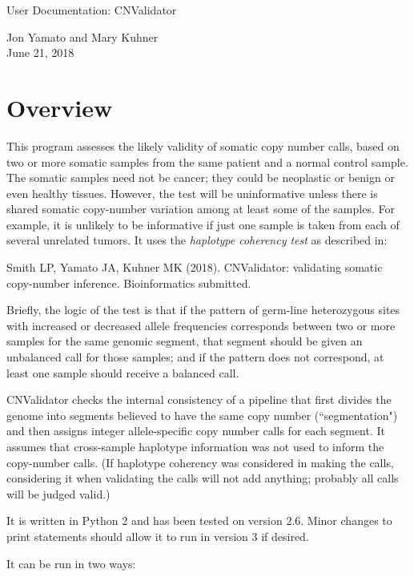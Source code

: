 \documentclass{article}
\begin{document}
 

\begin{large}
User Documentation:  CNValidator \\
\end{large}

{\flushleft
Jon Yamato and Mary Kuhner \\
June 21, 2018 \\
}

\section*{Overview}

This program assesses the likely validity of somatic copy number calls,
based on two or more somatic samples from the same patient and
a normal control sample.  The somatic
samples need not be cancer; they could be neoplastic or benign
or even healthy tissues.  However, the test will be uninformative
unless there is shared somatic copy-number variation
among at least some of the samples.  For example, it is unlikely to be
informative if just one sample is taken from each of several 
unrelated tumors.  It uses the {\it haplotype coherency test} as
described in:

Smith LP, Yamato JA, Kuhner MK (2018).  CNValidator:  validating
somatic copy-number inference.
Bioinformatics submitted.

Briefly, the logic of the test is that if the pattern of 
germ-line heterozygous sites with
increased or decreased allele frequencies corresponds between
two or more samples for the same genomic segment, that segment
should be given an unbalanced call for those samples; and
if the pattern does not correspond, at least one sample should
receive a balanced call.

CNValidator checks the internal consistency of a pipeline that
first divides the genome into segments believed to have the same
copy number (``segmentation") and then assigns integer allele-specific
copy number calls for each segment.  It assumes that cross-sample
haplotype information was not used to inform the copy-number calls.
(If haplotype coherency was considered in making the calls, considering
it when validating the calls will not add anything; probably all
calls will be judged valid.)

It is written in Python 2 and has been tested on version 2.6.
Minor changes to print statements should allow it to run in
version 3 if desired.

It can be run in two ways:
\end{document}
